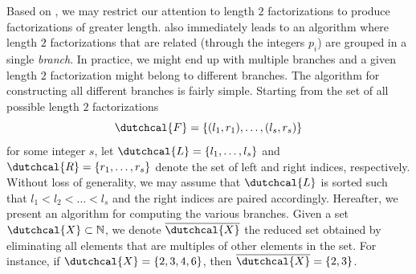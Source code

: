 \documentclass{article}
\numberwithin{equation}{section}
\theoremstyle{definition}
\begin{document}
Based on , we may restrict our attention to length $2$ factorizations to produce factorizations of greater length.  also immediately leads to an algorithm where length $2$ factorizations that are related (through the integers $p_i$) are grouped in a single \emph{branch}. In practice, we might end up with multiple branches and a given length $2$ factorization might belong to different branches. The algorithm for constructing all different branches is fairly simple. Starting from the set of all possible length $2$ factorizations
\begin{equation*}
    \dutchcal{F} = \{(l_1,r_1),\dots,(l_s,r_s)\}
\end{equation*}
for some integer $s$, let $\dutchcal{L} = \{l_1,\dots,l_s\}$ and $\dutchcal{R} = \{r_1,\dots,r_s\}$ denote the set of left and right indices, respectively. Without loss of generality, we may assume that $\dutchcal{L}$ is sorted such that $l_1 < l_2 < \dots < l_s$ and the right indices are paired accordingly. Hereafter, we present an algorithm for computing the various branches. Given a set $\dutchcal{X} \subset \mathbb{N}$, we denote $\overline{\dutchcal{X}}$ the reduced set obtained by eliminating all elements that are multiples of other elements in the set. For instance, if $\dutchcal{X}=\{2,3,4,6\}$, then $\overline{\dutchcal{X}}=\{2,3\}$. 
\end{document}
